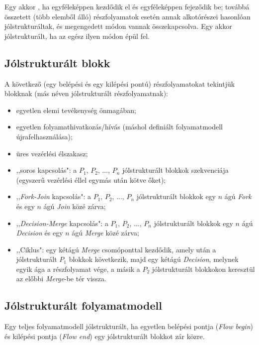 \begin{definicio}
	Egy  akkor , ha egyféleképpen kezdődik el és egyféleképpen fejeződik be; továbbá összetett (több elemből álló) részfolyamatok esetén annak alkotórészei hasonlóan jólstrukturáltak, és megengedett módon vannak összekapcsolva. Egy  akkor jólstrukturált, ha az egész ilyen módon épül fel.
\end{definicio}

\subsection{Jólstrukturált blokk}

A következő (egy belépési és egy kilépési pontú) részfolyamatokat tekintjük  blokknak (más néven jólstrukturált részfolyamatnak):

\begin{itemize}
\item egyetlen elemi tevékenység önmagában;
\item egyetlen folyamathivatkozás/hívás (máshol definiált folyamatmodell újrafelhasználása);
\item üres vezérlési élszakasz;
\item ,,soros kapcsolás": a $P_1$, $P_2$, ..., $P_n$ jólstrukturált blokkok szekvenciája (egyszerű vezérlési éllel egymás után kötve őket);
\item ,,\emph{Fork-Join} kapcsolás": a $P_1$, $P_2$, ..., $P_n$ jólstrukturált blokkok egy $n$ ágú \emph{Fork} és egy $n$ ágú \emph{Join} közé zárva; 
\item ,,\emph{Decision-Merge} kapcsolás": a $P_1$, $P_2$, ..., $P_n$ jólstrukturált blokkok egy $n$ ágú \emph{Decision} és egy $n$ ágú \emph{Merge} közé zárva;
\item ,,Ciklus": egy kétágú \emph{Merge} csomóponttal kezdődik, amely után a jólstrukturált $P_1$ blokkok következik, majd egy kétágú \emph{Decision}, melynek egyik ága a részfolyamat vége, a másik a $P_2$ jólstrukturált blokkokon keresztül az előbbi \emph{Merge}-be tér vissza.
\end{itemize}

\subsection{Jólstrukturált folyamatmodell}

Egy teljes folyamatmodell jólstrukturált, ha egyetlen belépési pontja (\emph{Flow begin}) és kilépési pontja (\emph{Flow end}) egy jólstrukturált blokkot zár közre.

